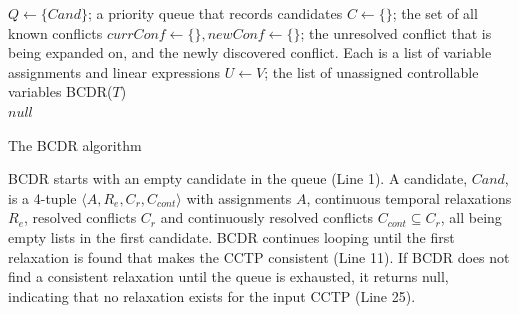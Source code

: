 \documentclass[jair,twoside,11pt,theapa]{article}
\let\oldnl\nl%
\newcommand{\nonl}{\renewcommand{\nl}{\let\nl\oldnl}}%
\begin{document}
	
\begin{algorithm}[h!]
		
\SetAlgoLined
{}
\Indm
{}
\Initialize{}
\;
{$Q\leftarrow\{\mathit{Cand}\}$; a priority queue that records candidates}\;
{$C\leftarrow\{\}$; the set of all known conflicts}\;
{$\mathit{currConf}\leftarrow \{\}, \mathit{newConf}\leftarrow \{\}$; the unresolved conflict that is being expanded on, and the newly discovered conflict. Each is a list of variable assignments and linear expressions}\;
{$U\leftarrow V$; the list of unassigned controllable variables}\;
\Indm
\Algorithm{}
\nonl\textsc{BCDR}($\mathit{T}$)\\
\Indp
{}
\Return $null$\;
\caption{The BCDR algorithm}
\label{alg:bcdr}
\end{algorithm}

BCDR starts with an empty candidate in the queue (Line 1). A candidate, $\mathit{Cand}$,
is a 4-tuple $\langle A,R_e,C_r,C_{cont}\rangle $ with assignments $A$, continuous temporal
relaxations $R_e$, resolved conflicts $C_r$ and continuously resolved conflicts
$C_{cont}\subseteq C_r$, all being empty lists in the first candidate. BCDR
continues looping until the first relaxation is found that makes the CCTP
consistent (Line 11). If BCDR does not find a consistent relaxation until the
queue is exhausted, it returns null, indicating that no relaxation exists for the
input CCTP (Line 25).
\end{document}
